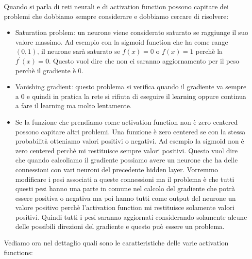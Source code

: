 \documentclass[14pt]{extreport}
\begin{document}
Quando si parla di reti neurali e di activation function possono capitare dei problemi che dobbiamo sempre considerare e dobbiamo cercare di
risolvere:
\begin{itemize}
	\item Saturation problem: un neurone viene considerato saturato se raggiunge il suo valore massimo. Ad esempio con la sigmoid function che ha come
	      range $(0,1)$, il neurone sarà saturato se $f(x)=0$ o $f(x)=1$ perchè la $f^{'}(x)=0$. Questo vuol dire che non ci saranno aggiornamento per
	      il peso perchè il gradiente è 0.
	\item Vanishing gradient: questo problema si verifica quando il gradiente va sempre a 0 e quindi in pratica la rete si rifiuta di eseguire il
	      learning oppure continua a fare il learning ma molto lentamente.
	\item Se la funzione che prendiamo come activation function non è zero centered possono capitare altri problemi. Una funzione è zero centered se
	      con la stessa probabilità otteniamo valori positivi o negativi. Ad esempio la sigmoid non è zero centered perchè mi restituisce sempre
	      valori positivi. Questo vuol dire che quando calcoliamo il gradiente possiamo avere un neurone che ha delle connessioni con vari neuroni del
	      precedente hidden layer. Vorremmo modificare i pesi associati a queste connessioni ma il problema è che tutti questi pesi hanno una parte in
	      comune nel calcolo del gradiente che potrà essere positiva o negativa ma poi hanno tutti come output del neurone un valore positivo perchè
	      l'activation function mi restituisce solamente valori positivi. Quindi tutti i pesi saranno aggiornati considerando solamente alcune delle
	      possibili direzioni del gradiente e questo può essere un problema.
\end{itemize}

Vediamo ora nel dettaglio quali sono le caratteristiche delle varie activation functions:
\end{document}
